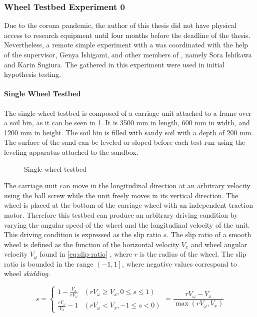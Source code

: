\subsubsection{Wheel Testbed Experiment 0}
\label{subsec:wheel-testbed-experiment-0}
Due to the corona pandemic, the author of this thesis did not have physical
access to research equipment until four months before the deadline of the
thesis. Nevertheless, a remote simple experiment with a
 was coordinated with the help of the
supervisor, Genya Ishigami, and other members of \SRG, namely Sora Ishikawa and
Karin Sugiura. The  gathered in this
experiment were used in initial hypothesis testing.

\paragraph{Single Wheel Testbed}
\label{para:single-wheel-testbed}
The single wheel testbed is composed of a carriage unit attached to a frame
over a soil bin, as it can be seen in \cref{fig:single-wheel-testbed}. It is
3500 mm in length, 600 mm in width, and 1200 mm in height. The soil bin is
filled with sandy soil with a depth of 200 mm. The surface of the sand can be
leveled or sloped before each test run using the leveling apparatus attached to
the sandbox.

\begin{figure}
    \centering
    
    \caption{Single wheel testbed}
    \label{fig:single-wheel-testbed}
\end{figure}


The carriage unit can move in the longitudinal direction at an arbitrary
velocity using the ball screw while the unit freely moves in its vertical
direction. The wheel is placed at the bottom of the carriage wheel with an
independent traction motor. Therefore this testbed can produce an arbitrary
driving condition by varying the angular speed of the wheel and the
longitudinal velocity of the unit. This driving condition is expressed as the
slip ratio $s$. The slip ratio of a smooth wheel is defined as the function of
the horizontal velocity $V_x$ and wheel angular velocity $V_\omega$ found in
\cref{eq:slip-ratio} \cite{Slip2009}, where $r$ is the radius of the wheel. The
slip ratio is bounded in the range $\left(-1,1\right]$, where negative values
correspond to wheel \emph{skidding}.

\begin{equation}
    s = \begin{cases} 
        1 - \frac{V_x}{r V_\omega} & (r V_\omega \geq V_x, 0 \leq s \leq 1) \\
        \frac{r V_\omega}{V_x} - 1 & (r V_\omega < V_x, -1 \leq s < 0)
    \end{cases} = \frac{r V_\omega - V_x}{\max(r V_\omega, V_x)}
    \label{eq:slip-ratio}
\end{equation}

